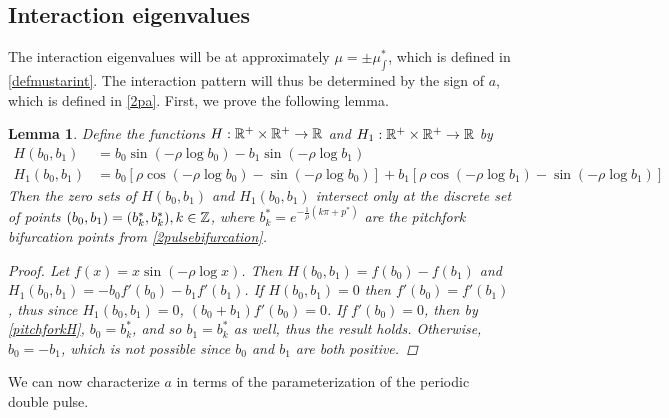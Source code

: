 \documentclass[10pt,reqno]{amsart}
\theoremstyle{plain}
\newtheorem{lemma}[theorem]{Lemma}
\theoremstyle{definition}
\theoremstyle{remark}
\numberwithin{theorem}{section}
\numberwithin{equation}{section}
\begin{document}
\subsection{Interaction eigenvalues}\label{sec:2pinteigs}

The interaction eigenvalues will be at approximately $\mu = \pm \mu_{\int}^*$, which is defined in \cref{defmustarint}. The interaction pattern will thus be determined by the sign of $a$, which is defined in \cref{2pa}. First, we prove the following lemma.

\begin{lemma}\label{lemma:Hoverlaplemma}
Define the functions $H: \mathbb{R}^+ \times \mathbb{R}^+ \rightarrow \mathbb{R}$ and $H_1: \mathbb{R}^+ \times \mathbb{R}^+ \rightarrow \mathbb{R}$ by 
\begin{align}
H(b_0, b_1) &= b_0 \sin \left( -\rho \log b_0 \right) - b_1 \sin \left( -\rho \log b_1 \right) \label{perdefH} \\
H_1(b_0, b_1) &= b_0 \left[ \rho \cos \left( -\rho \log b_0 \right) - \sin \left( -\rho \log b_0 \right) \right] + b_1 \left[ \rho \cos \left( -\rho \log b_1 \right) - \sin \left( -\rho \log b_1 \right) \right] \label{perdefH1}
\end{align}
Then the zero sets of $H(b_0, b_1)$ and $H_1(b_0, b_1)$ intersect only at the discrete set of points $(b_0, b_1) = (b_k^*, b_k^*), k \in \mathbb{Z}$, where $b^*_k = e^{-\frac{1}{\rho} (k \pi + p^*) }$ are the pitchfork bifurcation points from \cref{2pulsebifurcation}.
\begin{proof}
Let $f(x) = x \sin \left( -\rho \log x \right)$. Then $H(b_0, b_1) = f(b_0) - f(b_1)$ and $H_1(b_0, b_1) = -b_0 f'(b_0) - b_1 f'(b_1)$. If $H(b_0, b_1) = 0$ then $f'(b_0) = f'(b_1)$, thus since $H_1(b_0, b_1) = 0$, $(b_0 + b_1) f'(b_0) = 0$. If $f'(b_0) = 0$, then by \cref{pitchforkH}, $b_0 = b_k^*$, and so $b_1 = b_k^*$ as well, thus the result holds. Otherwise, $b_0 = -b_1$, which is not possible since $b_0$ and $b_1$ are both positive.
\end{proof}
\end{lemma}

We can now characterize $a$ in terms of the parameterization of the periodic double pulse. 
\end{document}
